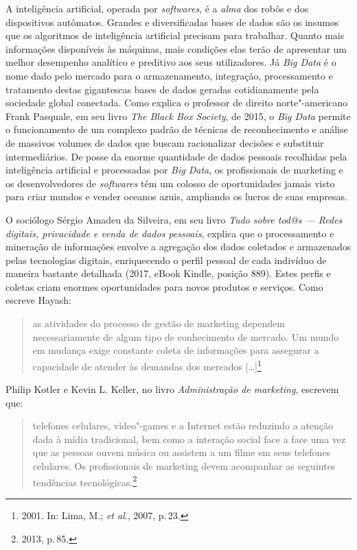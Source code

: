 A inteligência artificial, operada por \emph{softwares}, é a \emph{alma}
dos robôs e dos dispositivos autômatos. Grandes e diversificadas bases
de dados são os insumos que os algoritmos de inteligência artificial
precisam para trabalhar. Quanto mais informações disponíveis às
máquinas, mais condições elas terão de apresentar um melhor desempenho
analítico e preditivo aos seus utilizadores. Já \emph{Big Data} é o nome
dado pelo mercado para o armazenamento, integração, processamento e
tratamento destas gigantescas bases de dados geradas cotidianamente pela
sociedade global conectada. Como explica o professor de direito
norte"-americano Frank Pasquale, em seu livro \emph{The Black Box
Society}, de 2015, o \emph{Big Data} permite o funcionamento de um
complexo padrão de técnicas de reconhecimento e análise de massivos
volumes de dados que buscam racionalizar decisões e substituir
intermediários. De posse da enorme quantidade de dados pessoais
recolhidas pela inteligência artificial e processadas por \emph{Big
Data}, os profissionais de marketing e os desenvolvedores de \emph{softwares}
têm um colosso de oportunidades jamais visto para criar mundos e vender
oceanos azuis, ampliando os lucros de suas empresas.

O sociólogo Sérgio Amadeu da Silveira, em seu livro \emph{Tudo sobre tod@s --- Redes digitais, privacidade e venda
de dados pessoais}, explica que o processamento e mineração de
informações envolve a agregação dos dados coletados e armazenados pelas
tecnologias digitais, enriquecendo o perfil pessoal de cada indivíduo de
maneira bastante detalhada (2017, eBook Kindle, posição 889). Estes
perfis e coletas criam enormes oportunidades para novos produtos e
serviços. Como escreve Hayash:

\begin{quote}
as atividades do processo de gestão de marketing dependem necessariamente de algum tipo de conhecimento de mercado. Um mundo em mudança exige constante coleta de
informações para assegurar a capacidade de atender às demandas dos
mercados {[}\ldots{}{]}\footnote{2001. In: Lima, M.; \emph{et al}., 2007, p.\,23.}
\end{quote}

Philip Kotler e Kevin L. Keller, no livro \emph{Administração de
marketing}, escrevem que:

\begin{quote}
telefones celulares, video"-games e a Internet estão reduzindo a
atenção dada à mídia tradicional, bem como a interação social face a
face uma vez que as pessoas ouvem música ou assistem a um filme em seus
telefones celulares. Os profissionais de marketing devem acompanhar as
seguintes tendências tecnológicas.\footnote{2013, p.\,85.}
\end{quote}

